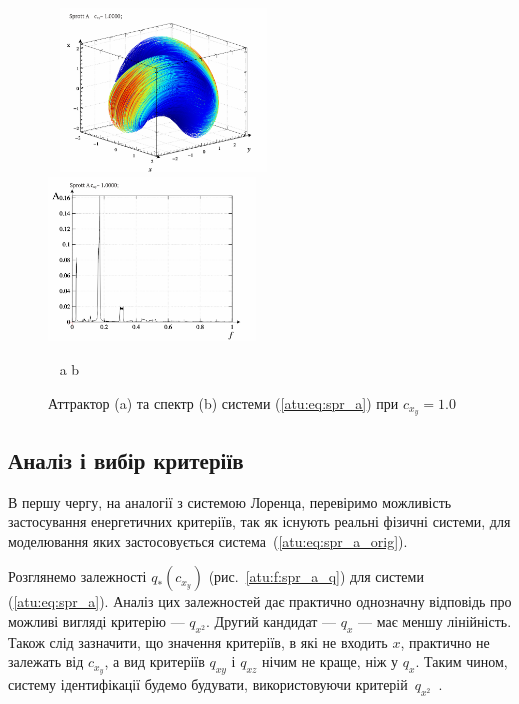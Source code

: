 \begin{figure}[htb!]
\begin{center}
  ~ \hfill
  \includegraphics[width=0.49\textwidth]{p/cha/spr_a/sprott_a-p_xyz_cx_y=1x000.png}
  \hfill
  \includegraphics[width=0.49\textwidth]{p/cha/spr_a/sprott_a_f-p_f_cx_y=1x000.png}
  \hfill ~
\end{center}
\vspace{-1.5ex}
\begin{center}
  ~ \hfill a \hfill\hfill b \hfill ~
\end{center}
\vspace{-2.0ex}
\caption{Аттрактор (a) та спектр (b) системи (\ref{atu:eq:spr_a}) при $c_{x_y} =1.0$}
\label{atu:f:spr_a_p_1000}
\end{figure}



\subsection{Аналіз і вибір критеріїв}%

В першу чергу, на аналогії з системою Лоренца, перевіримо
можливість застосування енергетичних критеріїв, так як існують
реальні фізичні системи, для моделювання яких застосовується
система~(\ref{atu:eq:spr_a_orig}).

Розглянемо залежності
$q_{*} (c_{x_y})$ (рис.~\ref{atu:f:spr_a_q}) для системи (\ref{atu:eq:spr_a}). Аналіз цих
залежностей дає практично однозначну відповідь про можливі
вигляді критерію ---
$q_{x^2}$. Другий кандидат ---
$q_{x}$ --- має меншу лінійність. Також слід зазначити, що значення
критеріїв, в які не входить
$x$, практично не залежать від
$c_{x_y}$, а вид критеріїв
$q_{xy}$ і
$q_{xz}$ нічим не краще, ніж у
$q_{x}$. Таким чином, систему ідентифікації будемо будувати,
використовуючи критерій~$q_{x^2}$~\cite{atu_kher2016}.

